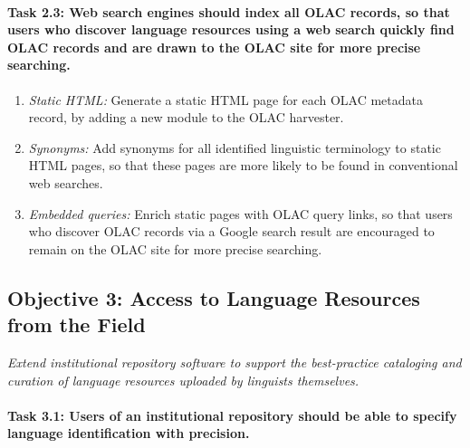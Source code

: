 

\def\task{2.3}
\paragraph{Task {\task}: Web search engines should index all OLAC records,
      so that users who discover language resources using a web search
      quickly find OLAC records and are drawn to the OLAC site for
      more precise searching.}

\begin{enumerate}[label=\emph{\task\alph*}]
\item \emph{Static HTML:}
  Generate a static HTML page for each OLAC metadata record, by adding
  a new module to the OLAC harvester.
\item \emph{Synonyms:}
  Add synonyms for all identified linguistic terminology to static HTML pages,
  so that these pages are more likely to be found in conventional web searches.
\item \emph{Embedded queries:}
  Enrich static pages with OLAC query links, so that users who discover
  OLAC records via a Google search result are encouraged to remain on the
  OLAC site for more precise searching.
\end{enumerate}

\subsection*{Objective 3: Access to Language Resources from the Field}

\emph{Extend institutional repository software to support the best-practice
    cataloging and curation of language resources 
    uploaded by linguists themselves.}

\def\task{3.1}
\paragraph{Task {\task}: Users of an institutional repository should be able
  to specify language identification with precision.}

